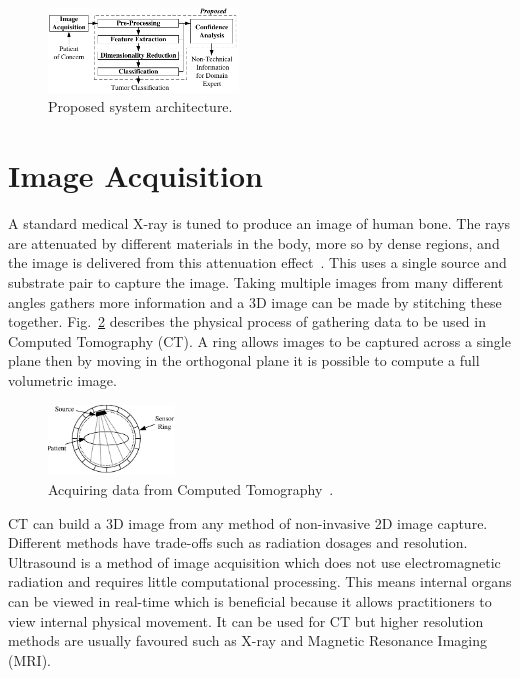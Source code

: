 \documentclass[journal]{IEEEtran}
\begin{document}
\begin{figure}[!htb]
   \centering
   \includegraphics[width = 0.45\textwidth]{Figures/Proposed.pdf}
   \caption{Proposed system architecture.}
   \label{fig:Proposed}
\end{figure}











\section{Image Acquisition}
\label{sec:image}

A standard medical X-ray is tuned to produce an image of human bone.
The rays are attenuated by different materials in the body, more so by dense regions, and the image is delivered from this attenuation effect~\cite{kayvan2006biomedical}. 
This uses a single source and substrate pair to capture the image.
Taking multiple images from many different angles gathers more information and a 3D image can be made by stitching these together.
Fig.~\ref{fig:ct} describes the physical process of gathering data to be used in Computed Tomography (CT).
A ring allows images to be captured across a single plane then by moving in the orthogonal plane it is possible to compute a full volumetric image. 

\begin{figure}[!htb]
   \centering
   \includegraphics[width = 0.3\textwidth]{Figures/CT.pdf}
   \caption{Acquiring data from Computed Tomography~\cite{kayvan2006biomedical}.}
   \label{fig:ct}
\end{figure}

CT can build a 3D image from any method of non-invasive 2D image capture.
Different methods have trade-offs such as radiation dosages and resolution.
Ultrasound is a method of image acquisition which does not use electromagnetic radiation and requires little computational processing. 
This means internal organs can be viewed in real-time which is beneficial because it allows practitioners to view internal physical movement. 
It can be used for CT but higher resolution methods are usually favoured such as X-ray and Magnetic Resonance Imaging (MRI).
\end{document}
